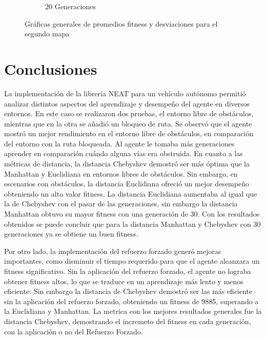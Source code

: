 \documentclass[conference]{IEEEtran}
\begin{document}
\begin{figure}[ht]
\begin{subfigure}{0.3\textwidth}
        \caption{20 Generaciones}
        \label{fig:chebyshev_mapa2}
    \end{subfigure}
    \caption{Gráficas generales de promedios fitness y desviaciones para el segundo mapa}
    \label{fig:graficas_generales_mapa2}
\end{figure}



\section{Conclusiones}
La implementación de la librería NEAT para un vehículo autónomo permitió analizar distintos aspectos del aprendizaje y desempeño del agente en diversos entornos. En este caso se realizaron dos pruebas, el entorno libre de obstáculos, mientras que en la otra se añadió un bloqueo de ruta. Se observó que el agente mostró un mejor rendimiento en el entorno libre de obstáculos, en comparación del entorno con la ruta bloqueada. Al agente le tomaba más generaciones aprender en comparación cuándo alguna vías era obstruida. En cuanto a las métricas de distancia, la distancia Chebyshev demostró ser más óptima que la Manhattan y Euclidiana en entornos libres de obstáculos. Sin embargo, en escenarios con obstáculos, la distancia Euclidiana ofreció un mejor desempeño obteniendo un alto valor fitness. La distancia Euclidiana aumentaba al igual que la de Chebyshev con el pasar de las generaciones, sin embargo la distancia Manhattan obtuvo su mayor fitness con una generación de 30. Con los resultados obtenidos se puede concluir que para la distancia Manhattan y Chebyshev con 30 generaciones ya se obtiene un buen fitness.

Por otro lado, la implementación del refuerzo forzado generó mejoras importantes, como disminuir el tiempo requerido para que el agente alcanzara un fitness significativo. Sin la aplicación del refuerzo forzado, el agente no lograba obtener fitness altos, lo que se traduce en un aprendizaje más lento y menos eficiente. Sin embargo la distancia de Chebyshev demostró ser las más eficiente sin la aplicación del refuerzo forzado, obteniendo un fitness de 9885, superando a la Euclidiana y Manhattan. La metrica con los mejores resultados generales fue la distancia Chebyshev, demostrando el incremeto del fitness en cada generación, con la aplicación o no del Refuerzo Forzado.
\printbibliography
\end{document}
